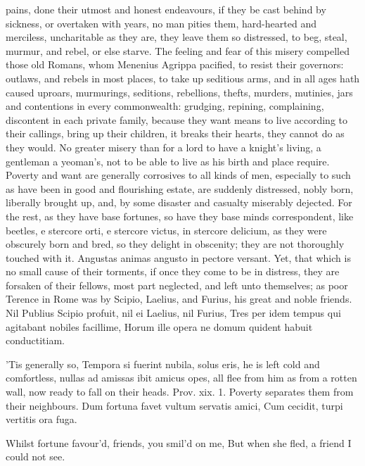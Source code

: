{pains, done their utmost and honest endeavours, if they be cast behind
by sickness, or overtaken with years, no man pities them, hard-hearted
and merciless, uncharitable as they are, they leave them so distressed,
to beg, steal, murmur, and  rebel, or else starve. The feeling
and fear of this misery compelled those old Romans, whom Menenius
Agrippa pacified, to resist their governors: outlaws, and rebels in
most places, to take up seditious arms, and in all ages hath caused
uproars, murmurings, seditions, rebellions, thefts, murders, mutinies,
jars and contentions in every commonwealth: grudging, repining,
complaining, discontent in each private family, because they want means
to live according to their callings, bring up their children, it breaks
their hearts, they cannot do as they would. No greater misery than for
a lord to have a knight's living, a gentleman a yeoman's, not to be
able to live as his birth and place require. Poverty and want are
generally corrosives to all kinds of men, especially to such as have
been in good and flourishing estate, are suddenly distressed,
nobly born, liberally brought up, and, by some disaster and
casualty miserably dejected. For the rest, as they have base fortunes,
so have they base minds correspondent, like beetles, e stercore orti, e
stercore victus, in stercore delicium, as they were obscurely born and
bred, so they delight in obscenity; they are not thoroughly touched
with it. Angustas animas angusto in pectore versant. Yet, that
which is no small cause of their torments, if once they come to be in
distress, they are forsaken of their fellows, most part neglected, and
left unto themselves; as poor Terence in Rome was by Scipio,
Laelius, and Furius, his great and noble friends.
Nil Publius Scipio profuit, nil ei Laelius, nil Furius,
Tres per idem tempus qui agitabant nobiles facillime,
Horum ille opera ne domum quident habuit conductitiam.

'Tis generally so, Tempora si fuerint nubila, solus eris, he is left
cold and comfortless, nullas ad amissas ibit amicus opes, all flee from
him as from a rotten wall, now ready to fall on their heads. Prov. xix.
1. Poverty separates them from their neighbours.
Dum fortuna favet vultum servatis amici,
Cum cecidit, turpi vertitis ora fuga.

Whilst fortune favour'd, friends, you smil'd on me,
But when she fled, a friend I could not see.

}

